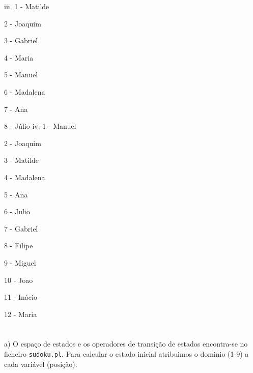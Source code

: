 \documentclass[11pt]{article}
\begin{document}
\hspace{0,5cm}iii. 1 - Matilde

\hspace{1,1cm}2 - Joaquim

\hspace{1,1cm}3 - Gabriel

\hspace{1,1cm}4 - Maria

\hspace{1,1cm}5 - Manuel

\hspace{1,1cm}6 - Madalena

\hspace{1,1cm}7 - Ana

\hspace{1,1cm}8 - Júlio
\newpage
\hspace{0,5cm}iv. 1 - Manuel

\hspace{1,1cm}2 - Joaquim

\hspace{1,1cm}3 - Matilde

\hspace{1,1cm}4 - Madalena

\hspace{1,1cm}5 - Ana

\hspace{1,1cm}6 - Julio

\hspace{1,1cm}7 - Gabriel

\hspace{1,1cm}8 - Filipe

\hspace{1,1cm}9 - Miguel

\hspace{1,1cm}10 - Joao

\hspace{1,1cm}11 - Inácio

\hspace{1,1cm}12 - Maria
\newline
\section{}

\hspace{0,6cm}a) O espaço de estados e os operadores de transição de estados encontra-se no ficheiro
\verb|sudoku.pl|. Para calcular o estado inicial atribuimos o dominio (1-9) a cada variável (posição).
\end{document}
